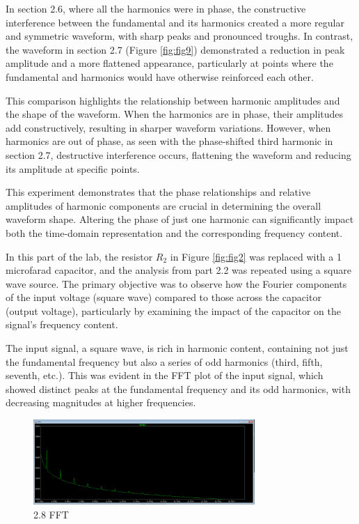 \documentclass{article}
\begin{document}
In section 2.6, where all the harmonics were in phase, the constructive interference between the fundamental 
and its harmonics created a more regular and symmetric waveform, with sharp peaks and pronounced troughs. 
In contrast, the waveform in section 2.7 (Figure \ref{fig:fig9}) demonstrated a reduction in peak amplitude and a more flattened appearance,
 particularly at points where the fundamental and harmonics would have otherwise reinforced each other.
\newline

This comparison highlights the relationship between harmonic amplitudes and the shape of the waveform. 
When the harmonics are in phase, their amplitudes add constructively, resulting in sharper waveform variations. 
However, when harmonics are out of phase, as seen with the phase-shifted third harmonic in section 2.7, destructive 
interference occurs, flattening the waveform and reducing its amplitude at specific points.
\newline

This experiment demonstrates that the phase relationships and relative amplitudes of harmonic components are 
crucial in determining the overall waveform shape. Altering the phase of just one harmonic can significantly 
impact both the time-domain representation and the corresponding frequency content.
\newline




In this part of the lab, the resistor \(R_2\) in Figure \ref{fig:fig2} was replaced with a 1 microfarad capacitor, 
and the analysis from part 2.2 was repeated using a square wave source. The primary objective was to observe 
how the Fourier components of the input voltage (square wave) compared to those across the capacitor (output voltage), 
particularly by examining the impact of the capacitor on the signal's frequency content.
\newline\

The input signal, a square wave, is rich in harmonic content, containing not just the fundamental frequency but 
also a series of odd harmonics (third, fifth, seventh, etc.). This was evident in the FFT plot of the input signal, 
which showed distinct peaks at the fundamental frequency and its odd harmonics, with decreasing magnitudes at higher frequencies.
\newline

\begin{figure}[H]
	\centering
	\includegraphics[width=0.75\textwidth]{Copy of Lab 4 - 2.8.PNG}
	\caption{2.8 FFT}
	\label{fig:fig10}
\end{figure}
\end{document}
